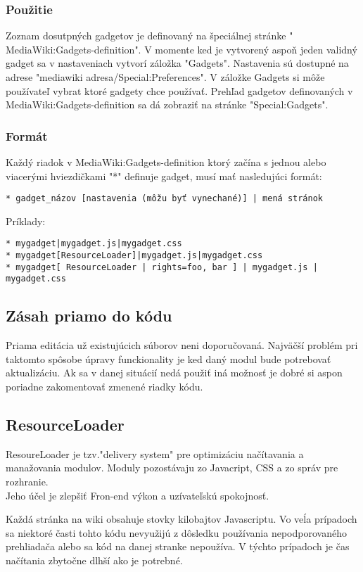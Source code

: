 \subsubsection{Použitie}
Zoznam dosutpných gadgetov je definovaný na špeciálnej stránke " MediaWiki:Gadgets-definition". V momente ked je vytvorený aspoň jeden validný gadget sa v nastaveniach vytvorí záložka "Gadgets". Nastavenia sú dostupné na adrese "mediawiki adresa/Special:Preferences". V záložke Gadgets si môže používateľ vybrat ktoré gadgety chce používať. Prehľad gadgetov definovaných v MediaWiki:Gadgets-definition sa dá zobraziť na stránke "Special:Gadgets".
\subsubsection{Formát}
Každý riadok v MediaWiki:Gadgets-definition ktorý začína s jednou alebo viacerými hviezdičkami "*" definuje gadget, musí mať nasledujúci formát:\\
\begin{verbatim}
* gadget_názov [nastavenia (môžu byť vynechané)] | mená stránok
\end{verbatim}
Príklady:
\begin{verbatim}
* mygadget|mygadget.js|mygadget.css
* mygadget[ResourceLoader]|mygadget.js|mygadget.css
* mygadget[ ResourceLoader | rights=foo, bar ] | mygadget.js | mygadget.css
\end{verbatim}


\subsection{Zásah priamo do kódu}
Priama editácia už existujúcich súborov neni doporučovaná. Najväčší problém pri taktomto spôsobe úpravy funckionality je ked daný modul bude potrebovať aktualizáciu. Ak sa v danej situácií nedá použiť iná možnosť je dobré si aspon poriadne zakomentovať zmenené riadky kódu.
 
\subsection{ResourceLoader}

ResoureLoader je tzv."delivery system" pre optimizáciu načítavania a manažovania modulov. Moduly pozostávaju zo Javacript, CSS a zo správ pre rozhranie.\\
Jeho účel je zlepšiť Fron-end výkon a uzívateľskú spokojnosť.

Každá stránka na wiki obsahuje stovky kilobajtov Javascriptu. Vo veĺa prípadoch sa niektoré časti tohto kódu nevyužijú z dôsledku používania nepodporovaného prehliadača alebo sa kód na danej stranke nepoužíva. V týchto prípadoch je čas načítania zbytočne dlhší ako je potrebné.\\

